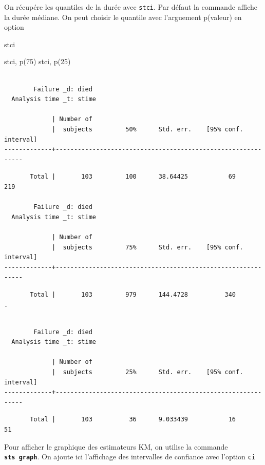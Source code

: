 \documentclass[
  12pt,
  letterpaper,
  DIV=11,
  numbers=noendperiod,
  onepage,
  openany]{scrreprt}
\newenvironment{Shaded}{\begin{snugshade}}{\end{snugshade}}
\newcommand{\KeywordTok}[1]{\textcolor[rgb]{0.94,0.87,0.69}{#1}}
\newcommand{\NormalTok}[1]{\textcolor[rgb]{0.80,0.80,0.80}{#1}}
\begin{document}
On récupére les quantiles de la durée avec \texttt{stci}. Par défaut la
commande affiche la durée médiane. On peut choisir le quantile avec
l'arguement p(valeur) en option

\begin{Shaded}
\begin{Highlighting}[]
\KeywordTok{stci}

\KeywordTok{stci}\NormalTok{, }\KeywordTok{p}\NormalTok{(75)}
\KeywordTok{stci}\NormalTok{, }\KeywordTok{p}\NormalTok{(25)}
\end{Highlighting}
\end{Shaded}

\begin{verbatim}

        Failure _d: died
  Analysis time _t: stime

             | Number of 
             |  subjects         50%      Std. err.    [95% conf. interval]
-------------+-------------------------------------------------------------
\end{verbatim}

\begin{verbatim}
       Total |       103         100      38.64425           69        219

        Failure _d: died
  Analysis time _t: stime

             | Number of 
             |  subjects         75%      Std. err.    [95% conf. interval]
-------------+-------------------------------------------------------------
\end{verbatim}

\begin{verbatim}
       Total |       103         979      144.4728          340          .
\end{verbatim}

\begin{verbatim}

        Failure _d: died
  Analysis time _t: stime

             | Number of 
             |  subjects         25%      Std. err.    [95% conf. interval]
-------------+-------------------------------------------------------------
\end{verbatim}

\begin{verbatim}
       Total |       103          36      9.033439           16         51
\end{verbatim}

Pour afficher le graphique des estimateurs KM, on utilise la commande
\textbf{\texttt{sts\ graph}}. On ajoute ici l'affichage des intervalles
de confiance avec l'option \texttt{ci}
\end{document}

